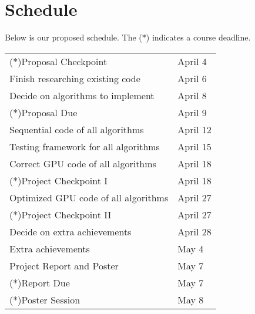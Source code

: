 \documentclass[12pt]{article}
\begin{document}
\section{Schedule}
Below is our proposed schedule. The ($*$) indicates a course deadline.
\begin{center}
	\begin{tabular}{l l}
		($*$)Proposal Checkpoint & April 4 \\
		Finish researching existing code & April 6 \\
		Decide on algorithms to implement & April 8 \\
		($*$)Proposal Due & April 9 \\
		Sequential code of all algorithms & April 12 \\
		Testing framework for all algorithms & April 15 \\
		Correct GPU code of all algorithms & April 18 \\
		($*$)Project Checkpoint I & April 18 \\
		Optimized GPU code of all algorithms & April 27 \\
		($*$)Project Checkpoint II & April 27 \\
		Decide on extra achievements & April 28 \\
		Extra achievements & May 4 \\
		Project Report and Poster & May 7 \\
		($*$)Report Due & May 7 \\
		($*$)Poster Session & May 8
	\end{tabular}
\end{center}



\end{document}
